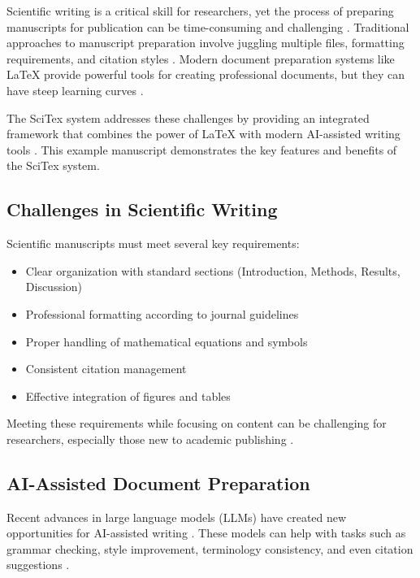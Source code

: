 
Scientific writing is a critical skill for researchers, yet the process of preparing manuscripts for publication can be time-consuming and challenging \cite{smith2010scientific}. Traditional approaches to manuscript preparation involve juggling multiple files, formatting requirements, and citation styles \cite{johnson2015academic}. Modern document preparation systems like LaTeX provide powerful tools for creating professional documents, but they can have steep learning curves \cite{lamport1994latex}.

The SciTex system addresses these challenges by providing an integrated framework that combines the power of LaTeX with modern AI-assisted writing tools \cite{watanabe2025scitex}. This example manuscript demonstrates the key features and benefits of the SciTex system.

\subsection{Challenges in Scientific Writing}

Scientific manuscripts must meet several key requirements:

\begin{itemize}
    \item Clear organization with standard sections (Introduction, Methods, Results, Discussion)
    \item Professional formatting according to journal guidelines
    \item Proper handling of mathematical equations and symbols
    \item Consistent citation management
    \item Effective integration of figures and tables
\end{itemize}

Meeting these requirements while focusing on content can be challenging for researchers, especially those new to academic publishing \cite{williams2018challenges}.

\subsection{AI-Assisted Document Preparation}

Recent advances in large language models (LLMs) have created new opportunities for AI-assisted writing \cite{brown2020language}. These models can help with tasks such as grammar checking, style improvement, terminology consistency, and even citation suggestions \cite{lee2022ai}. 

